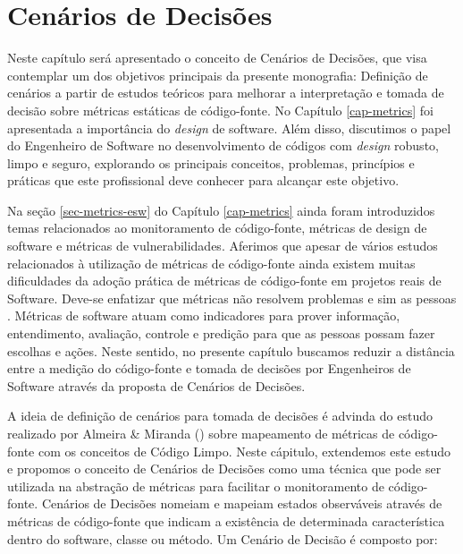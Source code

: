 \chapter{Cenários de Decisões}
\label{cap-cenarios}

Neste capítulo será apresentado o conceito de Cenários de Decisões, que visa contemplar um dos objetivos principais da presente monografia: Definição de cenários a partir de estudos teóricos para melhorar a interpretação e tomada de decisão sobre métricas estáticas de código-fonte. No Capítulo \ref{cap-metrics} foi apresentada a importância do \emph{design} de software. Além disso, discutimos o papel do Engenheiro de Software no desenvolvimento de códigos com \emph{design} robusto, limpo e seguro, explorando os principais conceitos, problemas, princípios e práticas que este profissional deve conhecer para alcançar este objetivo. 

%

Na seção \ref{sec-metrics-esw} do Capítulo \ref{cap-metrics} ainda foram introduzidos temas relacionados ao monitoramento de código-fonte, métricas de design de software e métricas de vulnerabilidades. Aferimos que apesar de vários estudos relacionados à utilização de métricas de código-fonte ainda existem muitas dificuldades da adoção prática de métricas de código-fonte em projetos reais de Software. Deve-se enfatizar que métricas não resolvem problemas e sim as pessoas \cite{westfall2005}. Métricas de software atuam como indicadores para prover informação, entendimento, avaliação, controle e predição para que as pessoas possam fazer escolhas e ações. Neste sentido, no presente capítulo buscamos reduzir a distância entre a medição do código-fonte e tomada de decisões por Engenheiros de Software através da proposta de Cenários de Decisões.

%

A ideia de definição de cenários para tomada de decisões é advinda do estudo realizado por Almeira \& Miranda (\citeyear{almeida2010}) sobre mapeamento de métricas de código-fonte com os conceitos de Código Limpo. Neste cápitulo, extendemos este estudo e propomos o conceito de Cenários de Decisões como uma técnica que pode ser utilizada na abstração de métricas para facilitar o monitoramento de código-fonte. Cenários de Decisões nomeiam e mapeiam estados observáveis através de métricas de código-fonte que indicam a existência de determinada característica dentro do software, classe ou método. Um Cenário de Decisão é composto por:

%

